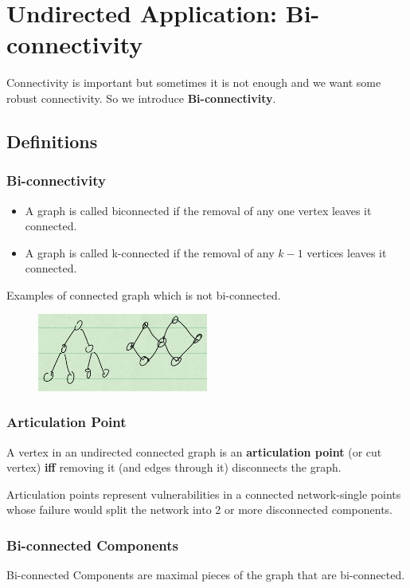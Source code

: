 \documentclass[en,hazy,blue,normal,12pt]{elegantnote}
\begin{document}
\section{Undirected Application: Bi-connectivity}
Connectivity is important but sometimes it is not enough and we want some 
robust connectivity. So we introduce \textbf{Bi-connectivity}.
\subsection{Definitions}
\subsubsection{Bi-connectivity}
\begin{itemize}
\item A graph is called biconnected if the removal of any one vertex leaves it 
connected.
\item A graph is called k-connected if the removal of any $k-1$ vertices leaves 
it connected.
\end{itemize}
Examples of connected graph which is not bi-connected.
\begin{figure}[H]
\centering
\includegraphics[width=0.5\textwidth]{bi-connectivity.png}
\end{figure}
\subsubsection{Articulation Point}
A vertex in an undirected connected graph is an \textbf{articulation point} (or 
cut vertex) \textbf{iff} removing it (and edges through it) disconnects the 
graph. 

Articulation points represent vulnerabilities in a connected 
network-single points whose failure would split the network into 2 or more 
disconnected components.

\subsubsection{Bi-connected Components}
Bi-connected Components are maximal pieces of the graph that are bi-connected.
\end{document}
